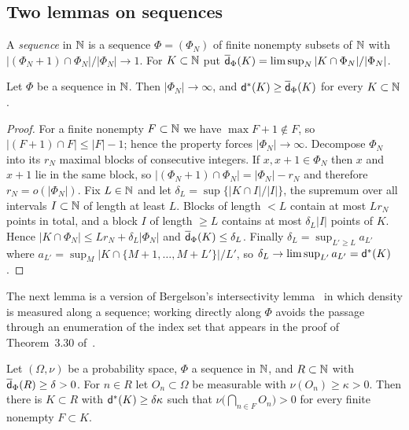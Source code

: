 \subsection{Two lemmas on \Fol{} sequences}

A \emph{\Fol{} sequence} in $\mathbb{N}$ is a sequence $\Phi=(\Phi_N)$ of finite nonempty
subsets of $\mathbb{N}$ with $|(\Phi_N+1)\cap\Phi_N|/|\Phi_N|\to 1$. For $K\subset\mathbb{N}$ put
$\overline{\mathsf{d}}_\Phi(K)=\limsup_N|K\cap\Phi_N|/|\Phi_N|$.

\begin{lemma}
\label{IB:lem:folner}
Let $\Phi$ be a \Fol{} sequence in $\mathbb{N}$. Then $|\Phi_N|\to\infty$, and
$\mathsf{d}^*(K)\ge\overline{\mathsf{d}}_\Phi(K)$ for every $K\subset\mathbb{N}$.
\end{lemma}

\begin{proof}
For a finite nonempty $F\subset\mathbb{N}$ we have $\max F+1\notin F$, so
$|(F+1)\cap F|\le|F|-1$; hence the \Fol{} property forces $|\Phi_N|\to\infty$.
Decompose $\Phi_N$ into its $r_N$ maximal blocks of consecutive integers. If
$x,x+1\in\Phi_N$ then $x$ and $x+1$ lie in the same block, so
$|(\Phi_N+1)\cap\Phi_N|=|\Phi_N|-r_N$ and therefore $r_N=o(|\Phi_N|)$. Fix $L\in\mathbb{N}$ and
let $\delta_L=\sup\{|K\cap I|/|I|\}$, the supremum over all intervals $I\subset\mathbb{N}$
of length at least $L$. Blocks of length $<L$ contain at most $Lr_N$ points in
total, and a block $I$ of length $\ge L$ contains at most $\delta_L|I|$ points of
$K$. Hence $|K\cap\Phi_N|\le Lr_N+\delta_L|\Phi_N|$ and
$\overline{\mathsf{d}}_\Phi(K)\le\delta_L$. Finally $\delta_L=\sup_{L'\ge L}a_{L'}$ where
$a_{L'}=\sup_M|K\cap\{M+1,\dots,M+L'\}|/L'$, so $\delta_L\to\limsup_{L'}a_{L'}=\mathsf{d}^*(K)$.
\end{proof}

The next lemma is a version of Bergelson's intersectivity
lemma~\cite{bergelson1985sets} in which density is measured along a \Fol{}
sequence; working directly along $\Phi$ avoids the passage through an
enumeration of the index set that appears in the proof of Theorem~3.30
of~\cite{kra2023problems}.

\begin{lemma}
\label{IB:lem:intersect}
Let $(\Omega,\nu)$ be a probability space, $\Phi$ a \Fol{} sequence in $\mathbb{N}$, and
$R\subset\mathbb{N}$ with $\overline{\mathsf{d}}_\Phi(R)\ge\delta>0$. For $n\in R$ let $O_n\subset \Omega$ be
measurable with $\nu(O_n)\ge\kappa>0$. Then there is $K\subset R$ with
$\mathsf{d}^*(K)\ge\delta\kappa$ such that $\nu\bigl(\bigcap_{n\in F}O_n\bigr)>0$ for every
finite nonempty $F\subset K$.
\end{lemma}

